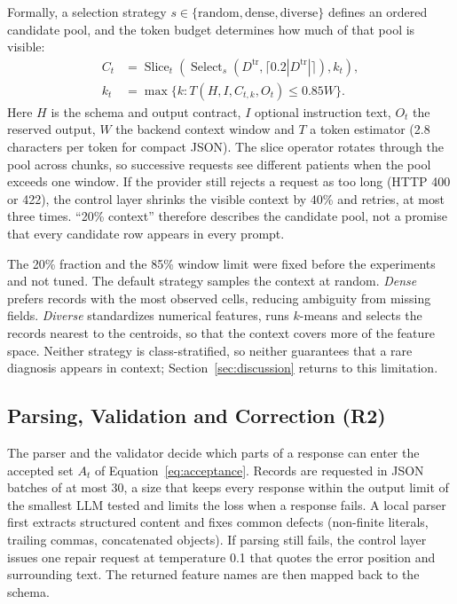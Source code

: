 \documentclass[conference]{IEEEtran}
\begin{document}
Formally, a selection strategy $s\in\{\text{random},\text{dense},\text{diverse}\}$ defines an ordered candidate pool, and the token budget determines how much of that pool is visible:
\begin{equation}
\begin{aligned}
C_t&=\operatorname{Slice}_{t}\!\left(\operatorname{Select}_{s}
(D^{\mathrm{tr}},\lceil0.2|D^{\mathrm{tr}}|\rceil),k_t\right),\\
k_t&=\max\{k:T(H,I,C_{t,k},O_t)\leq0.85W\}.
\end{aligned}
\label{eq:context}
\end{equation}
Here $H$ is the schema and output contract, $I$ optional instruction text, $O_t$ the reserved output, $W$ the backend context window and $T$ a token estimator (2.8 characters per token for compact JSON). The slice operator rotates through the pool across chunks, so successive requests see different patients when the pool exceeds one window. If the provider still rejects a request as too long (HTTP 400 or 422), the control layer shrinks the visible context by 40\% and retries, at most three times. ``20\% context'' therefore describes the candidate pool, not a promise that every candidate row appears in every prompt.

The 20\% fraction and the 85\% window limit were fixed before the experiments and not tuned. The default strategy samples the context at random. \emph{Dense} prefers records with the most observed cells, reducing ambiguity from missing fields. \emph{Diverse} standardizes numerical features, runs $k$-means and selects the records nearest to the centroids, so that the context covers more of the feature space. Neither strategy is class-stratified, so neither guarantees that a rare diagnosis appears in context; Section~\ref{sec:discussion} returns to this limitation.

\subsection{Parsing, Validation and Correction (R2)}
The parser and the validator decide which parts of a response can enter the accepted set $A_t$ of Equation~\eqref{eq:acceptance}.
Records are requested in JSON batches of at most 30, a size that keeps every response within the output limit of the smallest LLM tested and limits the loss when a response fails. A local parser first extracts structured content and fixes common defects (non-finite literals, trailing commas, concatenated objects). If parsing still fails, the control layer issues one repair request at temperature 0.1 that quotes the error position and surrounding text. The returned feature names are then mapped back to the schema.
\end{document}
